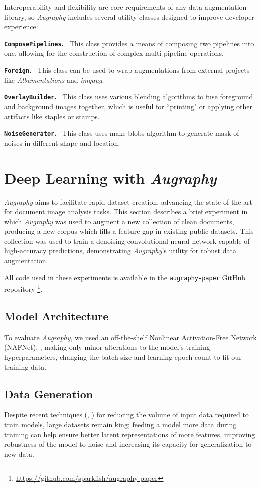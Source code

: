 \documentclass[runningheads]{llncs}
\begin{document}
\smallskip
Interoperability and flexibility are core requirements of any data augmentation library, so \emph{Augraphy} includes several utility classes designed to improve developer experience:

\noindent\textbf{\texttt{ComposePipelines}.} ~This class provides a means of composing two pipelines into one, allowing for the construction of complex multi-pipeline operations.

\smallskip
\noindent\textbf{\texttt{Foreign}.} ~This class can be used to wrap augmentations from external projects like \emph{Albumentations} and \emph{imgaug}.

\smallskip
\noindent\textbf{\texttt{OverlayBuilder}.} ~This class uses various blending algorithms to fuse foreground and background images together, which is useful for ``printing" or applying other artifacts like staples or stamps.

\smallskip
\noindent\textbf{\texttt{NoiseGenerator}.} ~This class uses make blobs algorithm to generate mask of noises in different shape and location.

\section{Deep Learning with \emph{Augraphy}}
\emph{Augraphy} aims to facilitate rapid dataset creation, advancing the state of the art for document image analysis tasks.
This section describes a brief experiment in which \emph{Augraphy} was used to augment a new collection of clean documents, producing a new corpus which fills a feature gap in existing public datasets. This collection was used to train a denoising convolutional neural network capable of high-accuracy predictions, demonstrating \emph{Augraphy}'s utility for robust data augmentation.

All code used in these experiments is available in the \texttt{augraphy-paper} GitHub repository \footnote{\url{https://github.com/sparkfish/augraphy-paper}}.

\subsection{Model Architecture}
To evaluate \emph{Augraphy}, we used an off-the-shelf Nonlinear Activation-Free Network (NAFNet), \cite{ref_nafnet}, making only minor alterations to the model's training hyperparameters, changing the batch size and learning epoch count to fit our training data.

\subsection{Data Generation}
Despite recent techniques (\cite{ref_tvt2040}, \cite{ref_vtssds}) for reducing the volume of input data required to train models, large datasets remain king; feeding a model more data during training can help ensure better latent representations of more features, improving robustness of the model to noise and increasing its capacity for generalization to new data.
\end{document}
